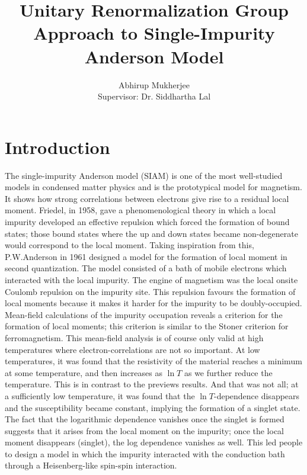 \documentclass[14pt]{extarticle}
\numberwithin{equation}{section}
\begin{document}
\title{Unitary Renormalization Group Approach to Single-Impurity Anderson Model}
\author{Abhirup Mukherjee\\[5pt]{Supervisor: Dr. Siddhartha Lal}}
\maketitle
\pagebreak
\tableofcontents
\pagebreak
	\section*{Introduction}
The single-impurity Anderson model (SIAM) is one of the most well-studied models in condensed matter physics and is the prototypical model for magnetism.
It shows how strong correlations between electrons give rise to a residual local moment.
Friedel\cite{Friedel}, in 1958, gave a phenomenological theory in which a local impurity developed an effective repulsion which forced the formation of bound states; those bound states where the up and down states became non-degenerate would correspond to the local moment.
Taking inspiration from this, P.W.Anderson\cite{Anderson} in 1961 designed a model for the formation of local moment in second quantization.
The model consisted of a bath of mobile electrons which interacted with the local impurity.
The engine of magnetism was the local onsite Coulomb repulsion on the impurity site.
This repulsion favours the formation of local moments because it makes it harder for the impurity to be doubly-occupied.
\pb Mean-field calculations of the impurity occupation reveals a criterion for the formation of local moments; this criterion is similar to the Stoner criterion for ferromagnetism. This mean-field analysis is of course only valid at high temperatures where electron-correlations are not so important. At low temperatures, it was found that the resistivity of the material reaches a minimum at some temperature, and then increases as \(\ln T\) as we further reduce the temperature. This is in contrast to the previews results. And that was not all; at a sufficiently low temperature, it was found that the \(\ln T\)-dependence disappears and the susceptibility became constant, implying the formation of a singlet state.
\pb The fact that the logarithmic dependence vanishes once the singlet is formed suggests that it arises from the local moment on the impurity; once the local moment disappears (singlet), the log dependence vanishes as well.
This led people to design a model in which the impurity interacted with the conduction bath through a Heisenberg-like spin-spin interaction.
\end{document}
